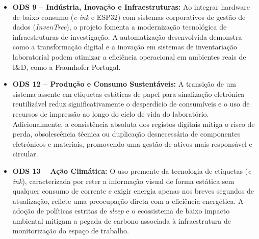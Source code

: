 \documentclass[10pt]{article}
\begin{document}
\begin{itemize}
    \item \textbf{ODS 9 -- Indústria, Inovação e Infraestruturas:} Ao integrar hardware de baixo consumo (\textit{e-ink} e ESP32) com sistemas corporativos de gestão de dados (\textit{InvenTree}), o projeto fomenta a modernização tecnológica de infraestruturas de investigação. A automatização desenvolvida demonstra como a transformação digital e a inovação em sistemas de inventariação laboratorial podem otimizar a eficiência operacional em ambientes reais de I\&D, como a Fraunhofer Portugal.
    \item \textbf{ODS 12 -- Produção e Consumo Sustentáveis:} A transição de um sistema assente em etiquetas estáticas de papel para sinalização eletrónica reutilizável reduz significativamente o desperdício de consumíveis e o uso de recursos de impressão ao longo do ciclo de vida do laboratório. Adicionalmente, a consistência absoluta dos registos digitais mitiga o risco de perda, obsolescência técnica ou duplicação desnecessária de componentes eletrónicos e materiais, promovendo uma gestão de ativos mais responsável e circular.
    \item \textbf{ODS 13 -- Ação Climática:} O uso premente da tecnologia de etiquetas (\textit{e-ink}), caracterizada por reter a informação visual de forma estática sem qualquer consumo de corrente e exigir energia apenas nos breves segundos de atualização, reflete uma preocupação direta com a eficiência energética. A adoção de políticas estritas de \textit{sleep} e o ecossistema de baixo impacto ambiental mitigam a pegada de carbono associada à infraestrutura de monitorização do espaço de trabalho.
\end{itemize}


 
 
\end{document}
